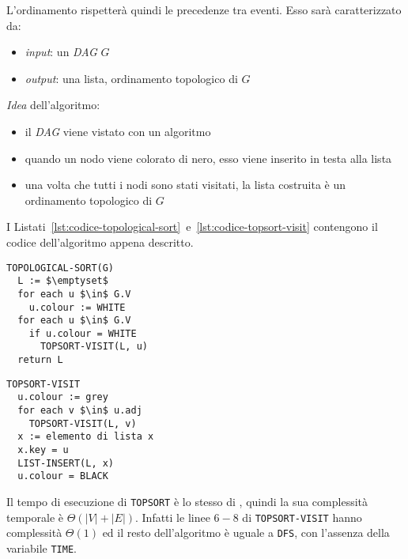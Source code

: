 \documentclass[italian, 10pt]{article}
\begin{document}
L'ordinamento rispetterà quindi le precedenze tra eventi.
Esso sarà caratterizzato da:

\begin{itemize}
  \item \textit{input}: un \textit{DAG} \(G\)
  \item \textit{output}: una lista, ordinamento topologico di \(G\)
\end{itemize}

\bigskip
\textit{Idea} dell'algoritmo:

\begin{itemize}
  \item il \textit{DAG} viene vistato con un algoritmo \DFS
  \item quando un nodo viene colorato di nero, esso viene inserito in testa alla lista
  \item una volta che tutti i nodi sono stati visitati, la lista costruita è un ordinamento topologico di \(G\)
\end{itemize}

\bigskip
I Listati~\ref{lst:codice-topological-sort}~e~\ref{lst:codice-topsort-visit} contengono il codice dell'algoritmo appena descritto.

\begin{minipage}[t]{0.495\textwidth}
  \begin{lstlisting}[style=pseudocode, caption={Algoritmo \texttt{TOPOLOGICAL-SORT}}, label={lst:codice-topological-sort}]
TOPOLOGICAL-SORT(G)
  L := $\emptyset$
  for each u $\in$ G.V
    u.colour := WHITE
  for each u $\in$ G.V
    if u.colour = WHITE
      TOPSORT-VISIT(L, u)
  return L
  \end{lstlisting}
\end{minipage}
\begin{minipage}[t]{0.495\textwidth}
  \begin{lstlisting}[style=pseudocode, caption={Algoritmo \texttt{TOPSORT-VISIT}}, label={lst:codice-topsort-visit}]
TOPSORT-VISIT
  u.colour := grey
  for each v $\in$ u.adj
    TOPSORT-VISIT(L, v)
  x := elemento di lista x
  x.key = u
  LIST-INSERT(L, x)
  u.colour = BLACK
  \end{lstlisting}
\end{minipage}

Il tempo di esecuzione di \texttt{TOPSORT} è lo stesso di \DFS, quindi la sua complessità temporale è \(\Theta(|V|+|E|)\).
Infatti le linee \(6-8\) di \texttt{TOPSORT-VISIT} hanno complessità \(\Theta(1)\) ed il resto dell'algoritmo è uguale a \texttt{DFS}, con l'assenza della variabile \texttt{TIME}.
\end{document}
